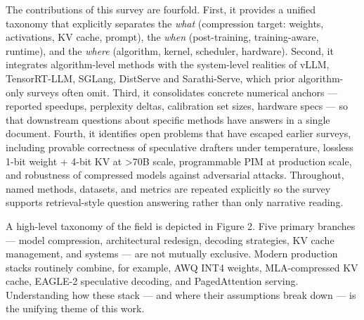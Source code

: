 \documentclass{article}
\begin{document}
The contributions of this survey are fourfold. First, it provides a unified taxonomy that explicitly separates the \emph{what} (compression target: weights, activations, KV cache, prompt), the \emph{when} (post-training, training-aware, runtime), and the \emph{where} (algorithm, kernel, scheduler, hardware). Second, it integrates algorithm-level methods with the system-level realities of vLLM, TensorRT-LLM, SGLang, DistServe and Sarathi-Serve, which prior algorithm-only surveys often omit. Third, it consolidates concrete numerical anchors --- reported speedups, perplexity deltas, calibration set sizes, hardware specs --- so that downstream questions about specific methods have answers in a single document. Fourth, it identifies open problems that have escaped earlier surveys, including provable correctness of speculative drafters under temperature, lossless 1-bit weight + 4-bit KV at \textgreater70B scale, programmable PIM at production scale, and robustness of compressed models against adversarial attacks. Throughout, named methods, datasets, and metrics are repeated explicitly so the survey supports retrieval-style question answering rather than only narrative reading.

A high-level taxonomy of the field is depicted in Figure 2. Five primary branches --- model compression, architectural redesign, decoding strategies, KV cache management, and systems --- are not mutually exclusive. Modern production stacks routinely combine, for example, AWQ INT4 weights, MLA-compressed KV cache, EAGLE-2 speculative decoding, and PagedAttention serving. Understanding how these stack --- and where their assumptions break down --- is the unifying theme of this work.
\end{document}
